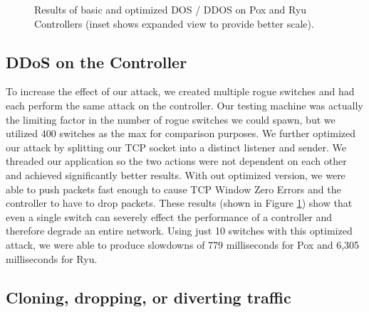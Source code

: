 \begin{figure}[ht]
	{\setlength{\fboxsep}{0pt}%
	\setlength{\fboxrule}{1pt}%
	}%
  \caption{Results of basic and optimized DOS / DDOS on Pox and Ryu Controllers (inset shows expanded view to provide better scale).}
  \label{fig:DOSattacks}
\end{figure}

\subsection{DDoS on the Controller}
   To increase the effect of our attack, we created multiple rogue switches and had each perform the same attack on the controller. Our testing machine was actually the limiting factor in the number of rogue switches we could spawn, but we utilized 400 switches as the max for comparison purposes.  We further optimized our attack by splitting our TCP socket into a distinct listener and sender. We threaded our application so the two actions were not dependent on each other and achieved significantly better results. With out optimized version, we were able to push packets fast enough to cause TCP Window Zero Errors and the controller to have to drop packets.  These results (shown in Figure \ref{fig:DOSattacks}) show that even a single switch can severely effect the performance of a controller and therefore degrade an entire network. Using just 10 switches with this optimized attack, we were able to produce slowdowns of 779 milliseconds for Pox and 6,305 milliseconds for Ryu.

\subsection{Cloning, dropping, or diverting traffic}

